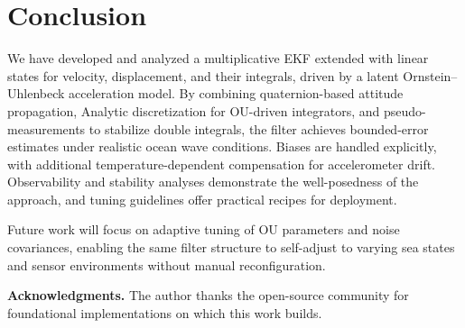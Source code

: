 \documentclass[10pt]{extarticle}
\begin{document}
\section{Conclusion}
\label{sec:conclusion}

We have developed and analyzed a multiplicative EKF extended with linear
states for velocity, displacement, and their integrals, driven by a latent
Ornstein--Uhlenbeck acceleration model. By combining quaternion-based attitude
propagation, Analytic discretization for OU-driven integrators, and pseudo-measurements to
stabilize double integrals, the filter achieves bounded-error estimates under
realistic ocean wave conditions. Biases are handled explicitly, with additional
temperature-dependent compensation for accelerometer drift. Observability and
stability analyses demonstrate the well-posedness of the approach, and tuning
guidelines offer practical recipes for deployment.

Future work will focus on adaptive tuning of OU parameters and noise covariances,
enabling the same filter structure to self-adjust to varying sea states and sensor
environments without manual reconfiguration.

\vspace{1em}
\noindent\textbf{Acknowledgments.}  
The author thanks the open-source community for foundational implementations
on which this work builds.
\end{document}
